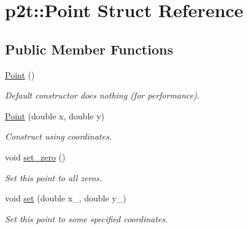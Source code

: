 \hypertarget{structp2t_1_1Point}{}\section{p2t\+:\+:Point Struct Reference}
\label{structp2t_1_1Point}
\subsection*{Public Member Functions}
\begin{DoxyCompactItemize}
\item 
\mbox{\label{structp2t_1_1Point_a7e573e8b3c263b088a2141d4977850b7}} 
\hyperlink{structp2t_1_1Point_a7e573e8b3c263b088a2141d4977850b7}{Point} ()
\begin{DoxyCompactList}\small\item\em Default constructor does nothing (for performance). \end{DoxyCompactList}\item 
\mbox{\label{structp2t_1_1Point_a60c0ed4b0d109b9172a50555220ebdc3}} 
\hyperlink{structp2t_1_1Point_a60c0ed4b0d109b9172a50555220ebdc3}{Point} (double x, double y)
\begin{DoxyCompactList}\small\item\em Construct using coordinates. \end{DoxyCompactList}\item 
\mbox{\label{structp2t_1_1Point_ac0b05395a17be952b6ea580495c9d11b}} 
void \hyperlink{structp2t_1_1Point_ac0b05395a17be952b6ea580495c9d11b}{set\+\_\+zero} ()
\begin{DoxyCompactList}\small\item\em Set this point to all zeros. \end{DoxyCompactList}\item 
\mbox{\label{structp2t_1_1Point_aa8a3a62cc47e65e0f717679adf12fd4e}} 
void \hyperlink{structp2t_1_1Point_aa8a3a62cc47e65e0f717679adf12fd4e}{set} (double x\+\_\+, double y\+\_\+)
\begin{DoxyCompactList}\small\item\em Set this point to some specified coordinates. \end{DoxyCompactList}\item 
\mbox{\label{structp2t_1_1Point_a0d5817d4ea8de01e587e4c1d54925046}} 

\end{DoxyCompactItemize}
